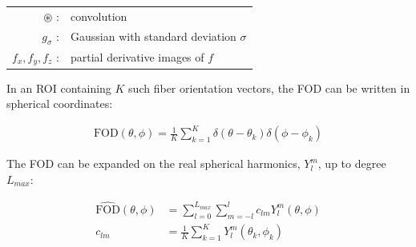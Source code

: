 \documentclass[landscape,a0paper,fontscale=0.36]{baposter} %
\begin{document}
\begin{poster}
{  \begin{center}
    \begin{tabular}{r l}
      $\circledast$ : &convolution\\[6pt]
      $g_{\sigma}$ : &Gaussian with standard deviation $\sigma$\\[6pt]
      $f_x, f_y, f_z$ : &partial derivative images of $f$
    \end{tabular}
  \end{center}

  \vspace{1.5em}

  In an ROI containing $K$ such fiber orientation vectors, the FOD can be written in spherical coordinates:
  
  \begin{align}
    \text{FOD}(\theta, \phi) = \frac{1}{K}\sum_{k=1}^K \delta(\theta - \theta_k)\delta(\phi - \phi_k)\nonumber
  \end{align}

  The FOD can be expanded on the real spherical harmonics, $Y_l^m$, up to degree $L_{max}$\cite{Alimi2018}:

  \begin{align}
    \hat{\text{FOD}}(\theta, \phi) &= \sum_{l=0}^{L_{max}}\sum_{m=-l}^l c_{lm}Y_l^m(\theta, \phi)\nonumber\\[6pt]
    c_{lm} &= \frac{1}{K}\sum_{k=1}^K Y_l^m(\theta_k, \phi_k)\nonumber
  \end{align}
}




\end{poster}
\end{document}
